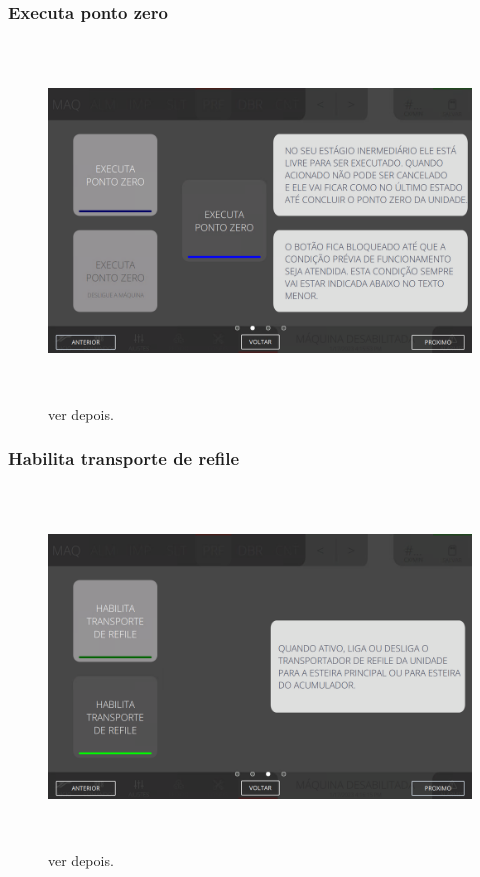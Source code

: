 \newpage
\thispagestyle{fancy}
\vspace*{\fill}
\subsubsection{\small{Executa ponto zero}}
\begin{figure}[h]
  \centering
  \includegraphics[width=576px,height=360px]{src/imagesFlexo/06-drilling/commands/e-2.png}
  \caption{ver depois.}
   \label{}
\end{figure}
\vspace*{\fill}

\newpage
\thispagestyle{fancy}
\vspace*{\fill}
\subsubsection{\small{Habilita transporte de refile}}
\begin{figure}[h]
  \centering
  \includegraphics[width=576px,height=360px]{src/imagesFlexo/06-drilling/commands/e-3.png}
  \caption{ver depois.}
   \label{}
\end{figure}
\vspace*{\fill}

